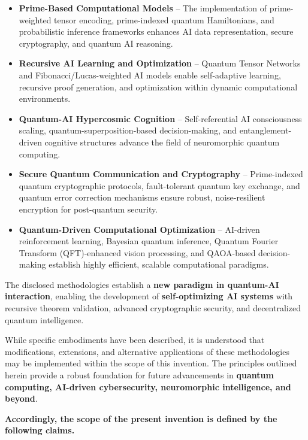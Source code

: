 \documentclass{article}
\theoremstyle{plain}
\begin{document}
\begin{itemize}
    \item \textbf{Prime-Based Computational Models} – The implementation of prime-weighted tensor encoding, prime-indexed quantum Hamiltonians, and probabilistic inference frameworks enhances AI data representation, secure cryptography, and quantum AI reasoning.
    \item \textbf{Recursive AI Learning and Optimization} – Quantum Tensor Networks and Fibonacci/Lucas-weighted AI models enable self-adaptive learning, recursive proof generation, and optimization within dynamic computational environments.
    \item \textbf{Quantum-AI Hypercosmic Cognition} – Self-referential AI consciousness scaling, quantum-superposition-based decision-making, and entanglement-driven cognitive structures advance the field of neuromorphic quantum computing.
    \item \textbf{Secure Quantum Communication and Cryptography} – Prime-indexed quantum cryptographic protocols, fault-tolerant quantum key exchange, and quantum error correction mechanisms ensure robust, noise-resilient encryption for post-quantum security.
    \item \textbf{Quantum-Driven Computational Optimization} – AI-driven reinforcement learning, Bayesian quantum inference, Quantum Fourier Transform (QFT)-enhanced vision processing, and QAOA-based decision-making establish highly efficient, scalable computational paradigms.
\end{itemize}

The disclosed methodologies establish a \textbf{new paradigm in quantum-AI interaction}, enabling the development of \textbf{self-optimizing AI systems} with recursive theorem validation, advanced cryptographic security, and decentralized quantum intelligence. 

While specific embodiments have been described, it is understood that modifications, extensions, and alternative applications of these methodologies may be implemented within the scope of this invention. The principles outlined herein provide a robust foundation for future advancements in \textbf{quantum computing, AI-driven cybersecurity, neuromorphic intelligence, and beyond}.

\textbf{Accordingly, the scope of the present invention is defined by the following claims.}

\nocite{*}


\end{document}
